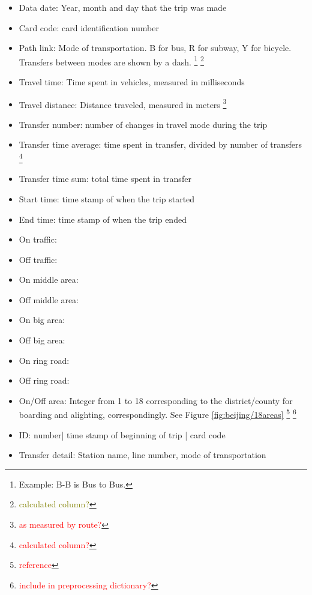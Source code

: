 \documentclass{article}
\newcommand{\selfnote}[1]{\footnote{\textcolor{red}{#1}}}
\newcommand{\Liangdoubt}[1]{\footnote{\textcolor{olive}{#1}}}
\begin{document}
\begin{itemize}
\item Data date: Year, month and day that the trip was made
\item Card code: card identification number
\item Path link: Mode of transportation. B for bus, R for subway, Y for bicycle. Transfers between modes are shown by a dash. \footnote{Example: B-B is Bus to Bus.} \Liangdoubt{calculated column?}
\item Travel time: Time spent in vehicles, measured in milliseconds
\item Travel distance: Distance traveled, measured in meters \selfnote{as measured by route?}
\item Transfer number: number of changes in travel mode during the trip
\item Transfer time average: time spent in transfer, divided by number of transfers \selfnote{calculated column?}
\item Transfer time sum: total time spent in transfer
\item Start time: time stamp of when the trip started
\item End time: time stamp of when the trip ended
\item On traffic: 
\item Off traffic:
\item On middle area:
\item Off middle area:
\item On big area:
\item Off big area:
\item On ring road:
\item Off ring road:
\item On/Off area: Integer from 1 to 18 corresponding to the district/county for boarding and alighting, correspondingly. See Figure \ref{fig:beijing/18areas} \selfnote{reference} \selfnote{include in preprocessing dictionary?} 
\item ID: number| time stamp of beginning of trip | card code
\item Transfer detail: Station name, line number, mode of transportation
\end{itemize}
\end{document}
